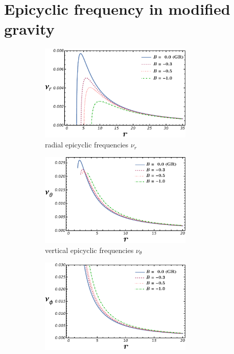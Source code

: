 \documentclass[12pt,a4paper,oneside]{book}
\begin{document}
\chapter{Epicyclic frequency in modified gravity}\label{Sec_Epi}
\begin{figure}[t]
	\begin{subfigure}[b]{0.5\textwidth}
         \centering
         \includegraphics[width=0.8\textwidth]{nu_r_for_a_1.pdf}
	\caption{radial epicyclic frequencies $\nu_r$}
    		\label{nu_r_for_a_1}
     \end{subfigure}
    \hfill
     \begin{subfigure}[b]{0.5\textwidth}
         \centering
         \includegraphics[width=0.8\textwidth]{nu_theta_for_a_1.pdf}
	\caption{vertical epicyclic frequencies $\nu_\theta$}
    		\label{nu_theta_for_a_1}
     \end{subfigure}
     \newline
	\newline
     \begin{subfigure}[b]{0.5\textwidth}
         \centering
         \includegraphics[width=0.8\textwidth]{nu_phi_for_a_1.pdf}

\end{subfigure}
\end{figure}
\end{document}
